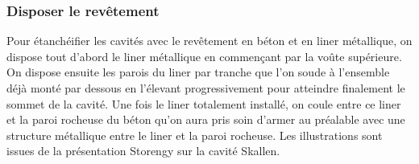 \documentclass[11pt,french,a4paper]{article}
\begin{document}
\FloatBarrier
\subsubsection*{Disposer le revêtement}

Pour étanchéifier les cavités avec le revêtement en béton et en liner métallique, on dispose tout d’abord le liner métallique en commençant par la voûte supérieure. On dispose ensuite les parois du liner par tranche que l’on soude à l’ensemble déjà monté par dessous en l’élevant progressivement pour atteindre finalement le sommet de la cavité. Une fois le liner totalement installé, on coule entre ce liner et la paroi rocheuse du béton qu’on aura pris soin d’armer au préalable avec une structure métallique entre le liner et la paroi rocheuse.
Les illustrations sont issues de la présentation Storengy sur la cavité Skallen.
\end{document}
